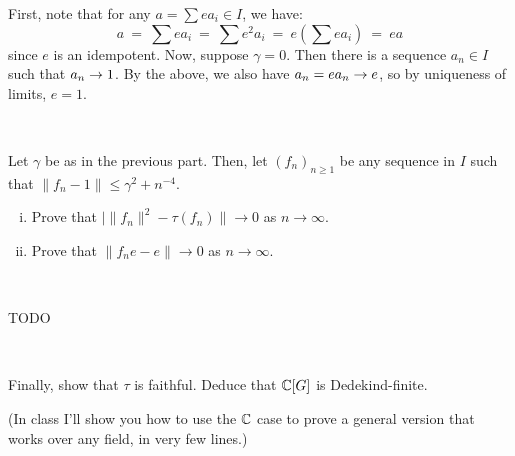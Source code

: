 \begin{pf}
	First, note that for any $a=\sum ea_{i}\in I$, we have:
	\begin{equation*}
		a \ = \ \sum ea_{i} \ = \ \sum e^{2}a_{i} \ = \ e\left(\sum ea_{i}\right) \ = \ ea
	\end{equation*}
	since $e$ is an idempotent.
	Now, suppose $\gamma=0$.
	Then there is a sequence $a_{n}\in I$ such that $a_{n}\rightarrow1$.
	By the above, we also have $a_{n}=ea_{n}\rightarrow e$,
	so by uniqueness of limits, $e=1$.
\end{pf} \

\begin{exr}
	Let $\gamma$ be as in the previous part.
	Then, let $(f_n)_{n\geq 1}$ be any sequence in $I$ such that
	$\|f_n-1\|\leq \gamma^2+n^{-4}$.
	\begin{enumerate}[i)]
		\item Prove that $|\|f_n\|^2-\tau(f_n)\|\rightarrow 0$ as $n\rightarrow\infty$.
		\item Prove that $\|f_ne-e\|\rightarrow 0$ as $n\rightarrow \infty$.
	\end{enumerate}
\end{exr} \

\begin{pf}
	TODO
\end{pf} \

\begin{exr}
	Finally, show that $\tau$ is faithful.
	Deduce that $\mathbb{C}[G]$ is Dedekind-finite.

	(In class I'll show you how to use the $\mathbb{C}$ case to prove a
	general version that works over any field, in very few lines.)
\end{exr} \

